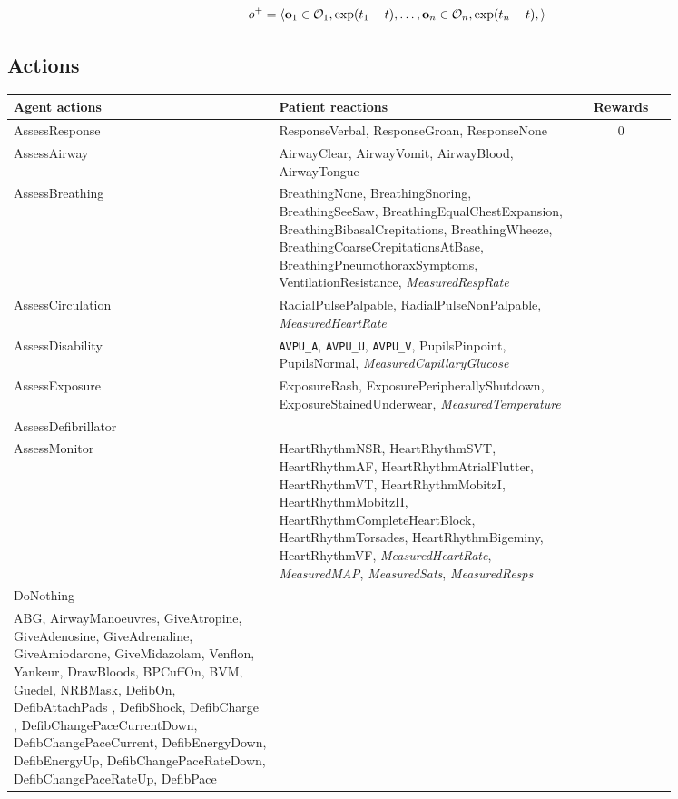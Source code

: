 \begin{equation}
     o^{+} = \langle \mathbf{o}_1 \in \mathcal{O}_1, \exp(t_1-t), \dots, \mathbf{o}_n \in \mathcal{O}_n, \exp(t_n-t), \rangle
\end{equation}

\newpage
\subsection{Actions}
\label{sec:auto-als-act}

\begin{table}[H]
\begin{tabular}{|p{0.4\linewidth}|p{0.45\linewidth}|c|}
\toprule
Agent actions &
  Patient reactions & Rewards
   \\
   \midrule
AssessResponse &
  ResponseVerbal,     ResponseGroan,     ResponseNone &
  \multirow{9}{*}{0} \\
AssessAirway &
  AirwayClear,     AirwayVomit,     AirwayBlood,     AirwayTongue &
   \\
AssessBreathing &
  BreathingNone,     BreathingSnoring,     BreathingSeeSaw,     BreathingEqualChestExpansion,     BreathingBibasalCrepitations,     BreathingWheeze,     BreathingCoarseCrepitationsAtBase,     BreathingPneumothoraxSymptoms,  VentilationResistance, \emph{MeasuredRespRate} &
   \\
AssessCirculation &
  RadialPulsePalpable,     RadialPulseNonPalpable, \emph{MeasuredHeartRate} &
   \\
AssessDisability &
  \verb|AVPU_A|,     \verb|AVPU_U|,     \verb|AVPU_V|, PupilsPinpoint,     PupilsNormal, \emph{MeasuredCapillaryGlucose} &
   \\
AssessExposure &
  ExposureRash,     ExposurePeripherallyShutdown,     ExposureStainedUnderwear, \emph{MeasuredTemperature} &
   \\
AssessDefibrillator &
   &
   \\
AssessMonitor &
  HeartRhythmNSR,
    HeartRhythmSVT,
    HeartRhythmAF,
    HeartRhythmAtrialFlutter,
    HeartRhythmVT,
    HeartRhythmMobitzI,
    HeartRhythmMobitzII,
    HeartRhythmCompleteHeartBlock,
    HeartRhythmTorsades,
    HeartRhythmBigeminy,
    HeartRhythmVF, \emph{MeasuredHeartRate}, \emph{MeasuredMAP}, \emph{MeasuredSats}, \emph{MeasuredResps} &
   \\
   DoNothing & & \\
   \midrule
ABG,     AirwayManoeuvres,     GiveAtropine,     GiveAdenosine,     GiveAdrenaline,     GiveAmiodarone,     GiveMidazolam,     Venflon,     Yankeur,     DrawBloods,     BPCuffOn,     BVM,     Guedel,     NRBMask,     DefibOn,     DefibAttachPads ,     DefibShock,     DefibCharge ,     DefibChangePaceCurrentDown,     DefibChangePaceCurrent,     DefibEnergyDown,     DefibEnergyUp,     DefibChangePaceRateDown,     DefibChangePaceRateUp,     DefibPace& 

\end{tabular}
\end{table}
